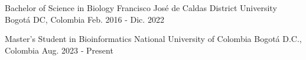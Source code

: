 


\begin{cventries}


\cventry
{Bachelor of Science in Biology} %
{Francisco José de Caldas District University} %
{Bogotá DC, Colombia} %
{Feb. 2016 - Dic. 2022} %
{ %
}

\cventry
{Master’s Student in Bioinformatics} %
{National University of Colombia} %
{Bogotá D.C., Colombia} %
{Aug. 2023 ‑ Present} %
{
}


\end{cventries}




